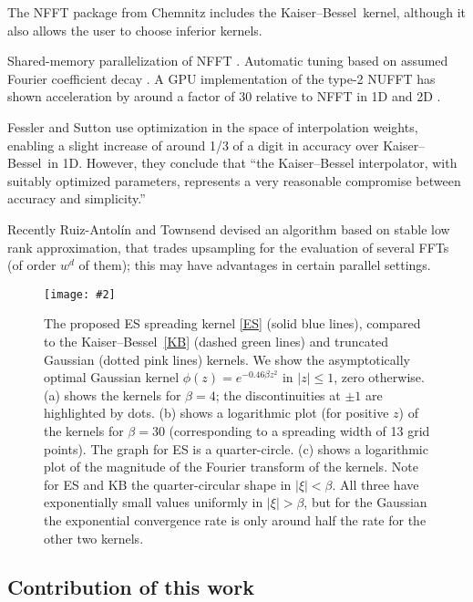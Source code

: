 \documentclass[10pt]{article}
\newcommand{\bfi}{\begin{figure}}
\newcommand{\efi}{\end{figure}}
\newcommand{\ca}[2]{\caption{#1 \label{#2}}}
\newcommand{\ig}[2]{\texttt{[image: \#2]}}
\newcommand{\freq}{\beta}          %
\newcommand{\KB}{Kaiser--Bessel}
\begin{document}
The NFFT package \cite{nfft} from Chemnitz
includes the \KB\ kernel, although it also allows the user to
choose inferior kernels.

Shared-memory parallelization of NFFT \cite{volkmer}.
Automatic tuning based on assumed Fourier coefficient decay \cite{nestler}.
A GPU implementation of the type-2 NUFFT has shown acceleration by around
a factor of 30 relative to NFFT in 1D and 2D \cite{cunfft}.

Fessler and Sutton \cite{fessler} use optimization in the space of
interpolation weights, enabling a slight increase of around 1/3 of a
digit in accuracy over \KB\ in 1D. However, they conclude that
``the
Kaiser--Bessel interpolator, with suitably optimized parameters,
represents a very reasonable compromise between accuracy and
simplicity.''

Recently Ruiz-Antol\'in and Townsend
\cite{townsendnufft} devised an algorithm
based on stable low rank approximation, that
trades upsampling for the evaluation of several FFTs (of order $w^d$ of them);
this may have advantages in certain parallel settings.



\bfi[t]  %
\hspace{-2ex}\ig{width=6.7in}{kernel.eps}
\ca{The proposed ES spreading kernel
  \eqref{ES} (solid blue lines), compared to the \KB\ \eqref{KB}
  (dashed green lines) and truncated Gaussian (dotted pink lines) kernels.
  We show the asymptotically optimal
  Gaussian kernel $\phi(z) = e^{-0.46 \beta z^2}$ in $|z|\le 1$, zero otherwise.
  (a) shows the kernels for $\freq=4$; the discontinuities at
  $\pm 1$ are highlighted by dots.
  (b) shows a logarithmic plot (for positive $z$) of the
  kernels for $\freq=30$
  (corresponding to a spreading width of 13 grid points).
  The graph for ES is a quarter-circle.
  (c) shows a logarithmic plot of the magnitude of the
  Fourier transform of the kernels.
  Note for ES and KB the quarter-circular shape in $|\xi|<\freq$.
  All three have exponentially small values uniformly in $|\xi|>\freq$, but
  for the Gaussian the exponential convergence rate is only around half
  the rate for the other two kernels.
}{f:kernel}
\efi


\subsection{Contribution of this work}
\end{document}
